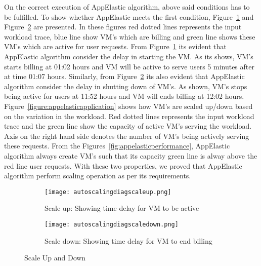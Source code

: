 On the correct execution of AppElastic algorithm, above said conditions has to be fulfilled. To show whether AppElastic meets the first condition, Figure~\ref{figure:billingactivescaleup} and Figure~\ref{figure:billingactivescaledown} are presented. In these figures red dotted lines represents the input workload trace, blue line show VM's which are billing and green line shows these VM's which are active for user requests. From Figure~\ref{figure:billingactivescaleup} its evident that AppElastic algorithm consider the delay in starting the VM. As its shows, VM's starts billing at 01:02 hours and VM will be active to serve users 5 minutes after at time 01:07 hours. Similarly, from Figure~\ref{figure:billingactivescaledown} its also evident that AppElastic algorithm consider the delay in shutting down of VM's. As shown, VM's stops being active for users at 11:52 hours and VM will ends billing at 12:02 hours.
\\
Figure~\ref{figure:appelasticapplication} shows how VM's are scaled up/down based on the variation in the workload. Red dotted lines represents the input workload trace and the green line show the capacity of active VM's serving the workload. Axis on the right hand side denotes the number of VM's being actively serving these requests. From the Figures~\ref{fig:appelasticperformance}, AppElastic algorithm always create VM's such that its capacity green line is alway above the red line user requests. With these two properties, we proved that AppElastic algorithm perform scaling operation as per its requirements.

\begin{figure}
     \centering
     \begin{subfigure}[b]{1.0\textwidth}
         \texttt{[image: autoscalingdiagscaleup.png]}
         \caption{Scale up: Showing time delay for VM to be active}
         \label{figure:billingactivescaleup}
     \end{subfigure}
     \begin{subfigure}[b]{0.9\textwidth}
         \texttt{[image: autoscalingdiagscaledown.png]}
         \caption{Scale down: Showing time delay for VM to end billing}
         \label{figure:billingactivescaledown}
     \end{subfigure}
     \caption{Scale Up and Down}
     \label{fig:billingactive}
\end{figure}


